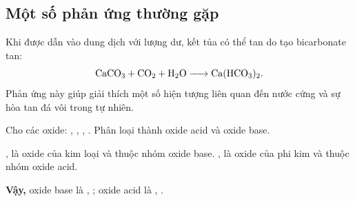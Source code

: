 \subsection{Một số phản ứng thường gặp}

Khi  được dẫn vào dung dịch  với lượng dư, kết tủa  có thể tan do tạo bicarbonate tan:
\[
\ce{CaCO3 + CO2 + H2O -> Ca(HCO3)2}.
\]
Phản ứng này giúp giải thích một số hiện tượng liên quan đến nước cứng và sự hòa tan đá vôi trong tự nhiên.

\begin{tuluyen}
Cho các oxide: , , , . Phân loại thành oxide acid và oxide base.
\begin{loigiaiBT}
,  là oxide của kim loại và thuộc nhóm oxide base. ,  là oxide của phi kim và thuộc nhóm oxide acid.

\textbf{Vậy,} oxide base là , ; oxide acid là , .
\end{loigiaiBT}
\end{tuluyen}
